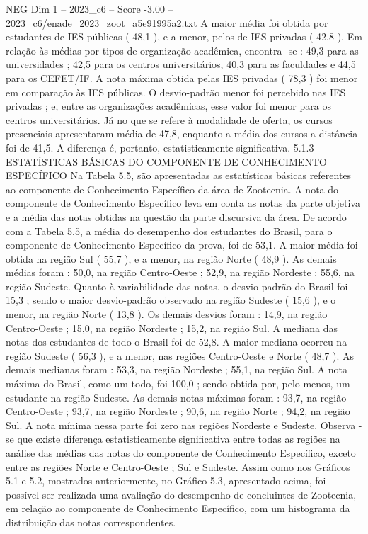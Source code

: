 \begin{textsample}{NEG Dim 1 – 2023\_c6 – Score -3.00 – 2023\_c6/enade\_2023\_zoot\_a5e91995a2.txt}
A maior média foi obtida por estudantes de IES públicas ( 48,1 ), e a menor, pelos de IES privadas ( 42,8 ).
Em relação às médias por tipos de organização acadêmica, encontra -se : 49,3 para as universidades ; 42,5 para os centros universitários, 40,3 para as faculdades e 44,5 para os CEFET/IF.
A nota máxima obtida pelas IES privadas ( 78,3 ) foi menor em comparação às IES públicas.
O desvio-padrão menor foi percebido nas IES privadas ; e, entre as organizações acadêmicas, esse valor foi menor para os centros universitários.
Já no que se refere à modalidade de oferta, os cursos presenciais apresentaram média de 47,8, enquanto a média dos cursos a distância foi de 41,5.
A diferença é, portanto, estatisticamente significativa. 5.1.3 ESTATÍSTICAS BÁSICAS DO COMPONENTE DE CONHECIMENTO ESPECÍFICO Na Tabela 5.5, são apresentadas as estatísticas básicas referentes ao componente de Conhecimento Específico da área de Zootecnia.
A nota do componente de Conhecimento Específico leva em conta as notas da parte objetiva e a média das notas obtidas na questão da parte discursiva da área.
De acordo com a Tabela 5.5, a média do desempenho dos estudantes do Brasil, para o componente de Conhecimento Específico da prova, foi de 53,1.
A maior média foi obtida na região Sul ( 55,7 ), e a menor, na região Norte ( 48,9 ).
As demais médias foram : 50,0, na região Centro-Oeste ; 52,9, na região Nordeste ; 55,6, na região Sudeste.
Quanto à variabilidade das notas, o desvio-padrão do Brasil foi 15,3 ; sendo o maior desvio-padrão observado na região Sudeste ( 15,6 ), e o menor, na região Norte ( 13,8 ).
Os demais desvios foram : 14,9, na região Centro-Oeste ; 15,0, na região Nordeste ; 15,2, na região Sul.
A mediana das notas dos estudantes de todo o Brasil foi de 52,8.
A maior mediana ocorreu na região Sudeste ( 56,3 ), e a menor, nas regiões Centro-Oeste e Norte ( 48,7 ).
As demais medianas foram : 53,3, na região Nordeste ; 55,1, na região Sul.
A nota máxima do Brasil, como um todo, foi 100,0 ; sendo obtida por, pelo menos, um estudante na região Sudeste.
As demais notas máximas foram : 93,7, na região Centro-Oeste ; 93,7, na região Nordeste ; 90,6, na região Norte ; 94,2, na região Sul.
A nota mínima nessa parte foi zero nas regiões Nordeste e Sudeste.
Observa -se que existe diferença estatisticamente significativa entre todas as regiões na análise das médias das notas do componente de Conhecimento Específico, exceto entre as regiões Norte e Centro-Oeste ; Sul e Sudeste.
Assim como nos Gráficos 5.1 e 5.2, mostrados anteriormente, no Gráfico 5.3, apresentado acima, foi possível ser realizada uma avaliação do desempenho de concluintes de Zootecnia, em relação ao componente de Conhecimento Específico, com um histograma da distribuição das notas correspondentes.

\end{textsample}
